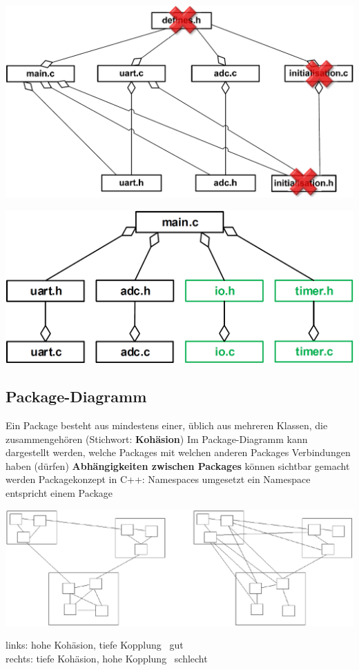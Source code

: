 \begin{minipage}[t]{0.48\columnwidth}
    \includegraphics[width=\columnwidth, align=t]{images/modulaisierung_bsp_schlecht.png}
\end{minipage}
\hfill
\begin{minipage}[t]{0.48\columnwidth}
    \includegraphics[width=\columnwidth, align=t]{images/modulaisierung_bsp_gut.png}
\end{minipage}


\subsection{Package-Diagramm}

\begin{outline}
    \1 Ein Package besteht aus mindestens einer, üblich aus mehreren Klassen, die zusammengehören (Stichwort: \textbf{Kohäsion})
    \1 Im Package-Diagramm kann dargestellt werden, welche Packages mit welchen anderen Packages Verbindungen haben (dürfen) 
        \2 \textbf{Abhängigkeiten zwischen Packages} können sichtbar gemacht werden
    \1 Packagekonzept in C++: Namespaces umgesetzt
        \2 ein Namespace entspricht einem Package
\end{outline}



\begin{center}
    \includegraphics[width=0.9\columnwidth]{images/modulaisierung_bsp.png}
\end{center}

links: hohe Kohäsion, tiefe Kopplung \textrightarrow\ gut \\
rechts: tiefe Kohäsion, hohe Kopplung \textrightarrow\ schlecht

